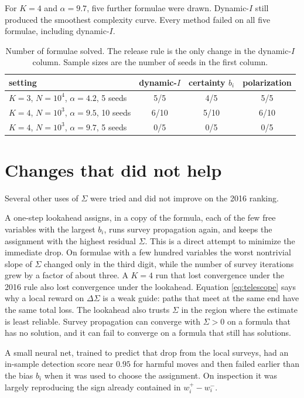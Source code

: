 \documentclass[11pt]{article}
\begin{document}
For $K=4$ and $\alpha=9.7$, five further formulae were drawn. Dynamic-$I$ still produced the smoothest complexity curve. Every method failed on all five formulae, including dynamic-$I$.

\begin{table}[ht]
\centering
\begin{tabular}{lccc}
\hline
setting & dynamic-$I$ & certainty $b_i$ & polarization \\
\hline
$K=3$, $N=10^4$, $\alpha=4.2$, 5 seeds & 5/5 & 4/5 & 5/5 \\
$K=4$, $N=10^3$, $\alpha=9.5$, 10 seeds & 6/10 & 5/10 & 6/10 \\
$K=4$, $N=10^3$, $\alpha=9.7$, 5 seeds & 0/5 & 0/5 & 0/5 \\
\hline
\end{tabular}
\caption{Number of formulae solved. The release rule is the only change in the dynamic-$I$ column. Sample sizes are the number of seeds in the first column.}
\end{table}

\section{Changes that did not help}

Several other uses of $\Sigma$ were tried and did not improve on the 2016 ranking.

A one-step lookahead assigns, in a copy of the formula, each of the few free variables with the largest $b_i$, runs survey propagation again, and keeps the assignment with the highest residual $\Sigma$. This is a direct attempt to minimize the immediate drop. On formulae with a few hundred variables the worst nontrivial slope of $\Sigma$ changed only in the third digit, while the number of survey iterations grew by a factor of about three. A $K=4$ run that lost convergence under the 2016 rule also lost convergence under the lookahead. Equation \eqref{eq:telescope} says why a local reward on $\Delta\Sigma$ is a weak guide: paths that meet at the same end have the same total loss. The lookahead also trusts $\Sigma$ in the region where the estimate is least reliable. Survey propagation can converge with $\Sigma>0$ on a formula that has no solution, and it can fail to converge on a formula that still has solutions.

A small neural net, trained to predict that drop from the local surveys, had an in-sample detection score near $0.95$ for harmful moves and then failed earlier than the bias $b_i$ when it was used to choose the assignment. On inspection it was largely reproducing the sign already contained in $w^+_i-w^-_i$.
\end{document}
